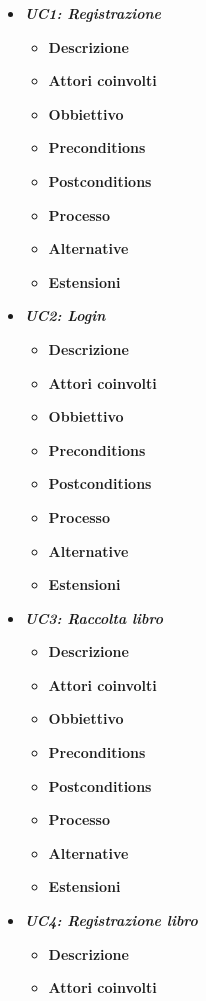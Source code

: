 

\begin{itemize}
	\item \textbf{\textit{UC1: Registrazione}}
	\begin{itemize}
		\item \textbf{Descrizione}
		\item \textbf{Attori coinvolti}
		\item \textbf{Obbiettivo}
		\item \textbf{Preconditions}
		\item \textbf{Postconditions}
		\item \textbf{Processo}
		\item \textbf{Alternative}
		\item \textbf{Estensioni}
	\end{itemize}
	\item \textbf{\textit{UC2: Login}}
	\begin{itemize}
		\item \textbf{Descrizione}
		\item \textbf{Attori coinvolti}
		\item \textbf{Obbiettivo}
		\item \textbf{Preconditions}
		\item \textbf{Postconditions}
		\item \textbf{Processo}
		\item \textbf{Alternative}
		\item \textbf{Estensioni}
	\end{itemize}
	\item \textit{\textbf{UC3: Raccolta libro}}
	\begin{itemize}
		\item \textbf{Descrizione}
		\item \textbf{Attori coinvolti}
		\item \textbf{Obbiettivo}
		\item \textbf{Preconditions}
		\item \textbf{Postconditions}
		\item \textbf{Processo}
		\item \textbf{Alternative}
		\item \textbf{Estensioni}
	\end{itemize}
	\item \textbf{\textit{UC4: Registrazione libro}}
	\begin{itemize}
		\item \textbf{Descrizione}
		\item \textbf{Attori coinvolti}

\end{itemize}
\end{itemize}
